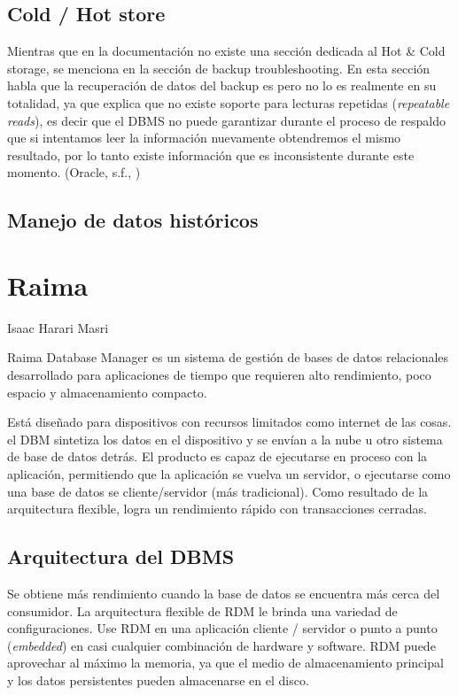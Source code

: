 \documentclass{acmart}
\begin{document}
\subsection{Cold / Hot store}
Mientras que en la documentación no existe una sección dedicada al Hot \& Cold storage, se menciona en la sección de backup troubleshooting. En esta sección habla que la recuperación de datos del backup es  pero no lo es realmente en su totalidad, ya que explica que no existe soporte para lecturas repetidas (\textit{repeatable reads}), es decir que el DBMS no puede garantizar durante el proceso de respaldo que si intentamos leer la información nuevamente obtendremos el mismo resultado, por lo tanto existe información que es inconsistente durante este momento. (Oracle, s.f., \cite{mysqlhot})

\subsection{Manejo de datos históricos}

\newpage

\section{Raima}
Isaac Harari Masri

Raima Database Manager es un sistema de gestión de bases de datos relacionales desarrollado para aplicaciones de tiempo que requieren alto rendimiento, poco espacio y almacenamiento compacto.

Está diseñado para dispositivos con recursos limitados como internet de las cosas. el DBM sintetiza los datos en el dispositivo y se envían a la nube u otro sistema de base de datos detrás. El producto es capaz de ejecutarse en proceso con la aplicación, permitiendo que la aplicación se vuelva un servidor, o ejecutarse como una base de datos se cliente/servidor (más tradicional). Como resultado de la arquitectura flexible, logra un rendimiento rápido con transacciones cerradas.
\subsection{Arquitectura del DBMS}
Se obtiene más rendimiento cuando la base de datos se encuentra más cerca del consumidor. La arquitectura flexible de RDM le brinda una variedad de configuraciones. Use RDM en una aplicación cliente / servidor o punto a punto (\textit{embedded}) en casi cualquier combinación de hardware y software. RDM puede aprovechar al máximo la memoria, ya que el medio de almacenamiento principal y los datos persistentes pueden almacenarse en el disco. \cite{Rpdf1, Rarch}
\end{document}
